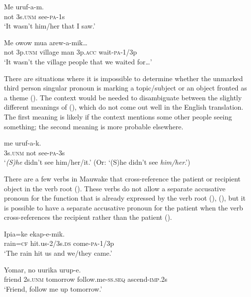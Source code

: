 \ea%
\label{ex:x561}
\gll Me  uruf-a-m. \\
not 3s.\textsc{unm} see-\textsc{pa}-1s\\
\glt`It wasn't him/her that I saw.'
\z

\ea%
\label{ex:x562}
\gll Me  owow mua  arew-a-mik{\dots} \\
not 3p.\textsc{unm} village man 3p.\textsc{acc} wait-\textsc{pa}-1/3p\\
\glt`It wasn't the village people that we waited for{\dots}'
\z

There are situations where it is impossible to determine whether the unmarked third person singular pronoun is marking a topic/subject or an object fronted as a theme (). The context would be needed to disambiguate between the slightly different meanings of (), which do not come out well in the English translation. The first meaning is likely if the context mentions some other people seeing something; the second meaning is more probable elsewhere. 

\ea%
\label{ex:x563}
\gll {} me uruf-a-k. \\
3s.\textsc{unm} not see-\textsc{pa}-3s\\
\glt`\textit{(S)he} didn't see him/her/it.' (Or: `(S)he didn't see \textit{him/her}.')
\z

There are a few verbs in Mauwake that cross-reference the patient or recipient object in the verb root (). These verbs do not allow a separate accusative pronoun for the function that is already expressed by the verb root (), (), but it is possible to have a separate accusative pronoun for the patient when the verb cross-references the recipient rather than the patient ().

\ea%
\label{ex:x564}
\gll Ipia=ke  ekap-e-mik. \\
rain=\textsc{cf} hit.us-2/3s.\textsc{ds} come-\textsc{pa}-1/3p\\
\glt`The rain hit us and we/they came.'
\z

\ea%
\label{ex:x1526}
\gll Yomar, no uurika \textstyleEmphasizedVernacularWords{-} urup-e. \\
friend 2s.\textsc{unm} tomorrow follow.me-\textsc{ss}.\textsc{seq} ascend-\textsc{imp}.2s\\
\glt`Friend, follow me up tomorrow.'
\z

